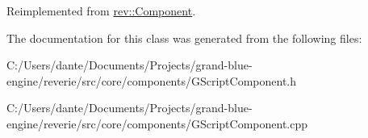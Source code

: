 Reimplemented from \mbox{\hyperlink{classrev_1_1_component_ae2827b14c278588b95e01c4743fae674}{rev\+::\+Component}}.



The documentation for this class was generated from the following files\+:\begin{DoxyCompactItemize}
\item 
C\+:/\+Users/dante/\+Documents/\+Projects/grand-\/blue-\/engine/reverie/src/core/components/G\+Script\+Component.\+h\item 
C\+:/\+Users/dante/\+Documents/\+Projects/grand-\/blue-\/engine/reverie/src/core/components/G\+Script\+Component.\+cpp\end{DoxyCompactItemize}
